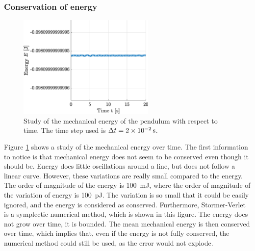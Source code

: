 \documentclass[a4paper,12pt,twoside]{article}
\begin{document}
\subsubsection{Conservation of energy}

\begin{figure}[h]
\centering
	\includegraphics[width=0.6\textwidth]{graphs/a_ener.eps}
	\caption{Study of the mechanical energy of the pendulum with respect to time. The time step used is $\Delta t = \SI{2d-2}{\s}$.}
	\label{fig:a-ener}
\end{figure}

Figure \ref{fig:a-ener} shows a study of the mechanical energy over time.
The first information to notice is that mechanical energy does not seem to be conserved even though it should be.
Energy does little oscillations around a line, but does not follow a linear curve. 
However, these variations are really small compared to the energy.
The order of magnitude of the energy is \SI{100}{\milli\joule}, where the order of magnitude of the variation of energy is \SI{100}{\pico\joule}. %
The variation is so small that it could be easily ignored, and the energy is considered as conserved.
Furthermore, Stormer-Verlet is a symplectic numerical method, which is shown in this figure.
The energy does not grow over time, it is bounded.
The mean mechanical energy is then conserved over time, which implies that, even if the energy is not fully conserved, the numerical method could still be used, as the error would not explode. %
\end{document}
